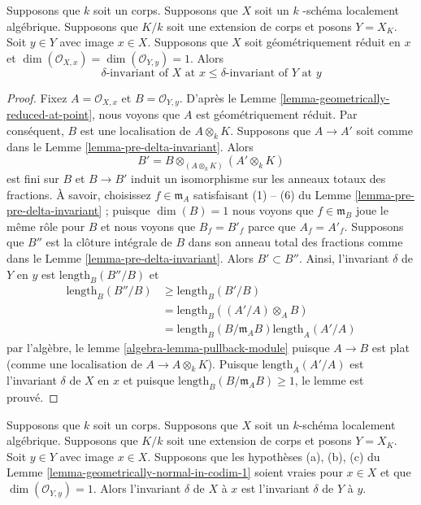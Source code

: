 \begin{lemma}
\label{lemma-delta-invariant-and-change-of-fields}
Supposons que $k$ soit un corps. Supposons que $X$
soit un $k$ -schéma localement algébrique. Supposons
que $K/k$ soit une extension de corps et posons $Y =
X_K$. Soit $y \in Y$ avec image $x \in X$. Supposons
que $X$ soit géométriquement réduit en $x$ et
$\dim(\mathcal{O}_{X, x}) = \dim(\mathcal{O}_{Y, y}) = 1$. Alors
$$
\delta\text{-invariant of }X\text{ at }x \leq
\delta\text{-invariant of }Y\text{ at }y
$$
\end{lemma}

\begin{proof}
Fixez $A = \mathcal{O}_{X, x}$ et $B =
\mathcal{O}_{Y, y}$. D'après le Lemme
\ref{lemma-geometrically-reduced-at-point}, nous voyons que
$A$ est géométriquement réduit. Par conséquent, $B$ est une
localisation de $A \otimes_k K$. Supposons que $A \to A'$
soit comme dans le Lemme \ref{lemma-pre-delta-invariant}. Alors
$$
B' = B \otimes_{(A \otimes_k K)} (A' \otimes_k K)
$$
est fini sur $B$ et $B \to B'$ induit un isomorphisme sur les
anneaux totaux des fractions. À savoir, choisissez $f \in
\mathfrak m_A$ satisfaisant (1) -- (6) du Lemme
\ref{lemma-pre-pre-delta-invariant} ; puisque $\dim(B) = 1$ nous
voyons que $f \in \mathfrak m_B$ joue le même rôle pour $B$ et nous
voyons que $B_f = B'_f$ parce que $A_f = A'_f$. Supposons que $B''$ est
la clôture intégrale de $B$ dans son anneau total des fractions comme
dans le Lemme \ref{lemma-pre-delta-invariant}. Alors $B' \subset B''$.
Ainsi, l'invariant $\delta$ de $Y$ en $y$ est $\text{length}_B(B''/B)$ et
\begin{align*}
\text{length}_B(B''/B)
& \geq
\text{length}_B(B'/B) \\
& =
\text{length}_B((A'/A) \otimes_A B) \\
& =
\text{length}_B(B/\mathfrak m_A B) \text{length}_A(A'/A)
\end{align*}
par l'algèbre, le lemme
\ref{algebra-lemma-pullback-module} puisque $A \to B$ est plat
(comme une localisation de $A \to A \otimes_k K$). Puisque
$\text{length}_A(A'/A)$ est l'invariant $\delta$ de $X$ en $x$ et
puisque $\text{length}_B(B/\mathfrak m_A B) \geq 1$, le lemme est prouvé.
\end{proof}

\begin{lemma}
\label{lemma-delta-invariant-and-change-of-fields-better}
Supposons que $k$ soit un corps. Supposons que $X$ soit
un $k$-schéma localement algébrique. Supposons que
$K/k$ soit une extension de corps et posons $Y = X_K$.
Soit $y \in Y$ avec image $x \in X$. Supposons que les
hypothèses (a), (b), (c) du Lemme
\ref{lemma-geometrically-normal-in-codim-1} soient vraies pour
$x \in X$ et que $\dim(\mathcal{O}_{Y, y}) = 1$. Alors
l'invariant $\delta$ de $X$ à $x$ est l'invariant $\delta$ de $Y$ à $y$.
\end{lemma}

